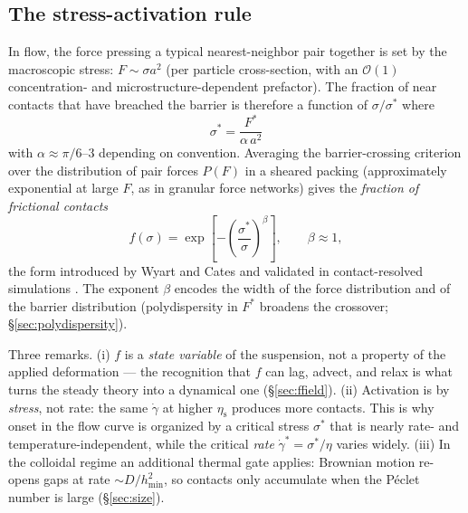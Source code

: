 \documentclass[11pt]{article}
\newcommand{\sigmastar}{\sigma^{*}}
\newcommand{\etas}{\eta_{\mathrm{s}}}
\newcommand{\Fstar}{F^{*}}
\newcommand{\gdot}{\dot{\gamma}}
\begin{document}
\subsection{The stress-activation rule}
\label{sec:activation}
In flow, the force pressing a typical nearest-neighbor pair together is set by the macroscopic stress: $F \sim \sigma a^2$ (per particle cross-section, with an $\mathcal{O}(1)$ concentration- and microstructure-dependent prefactor). The fraction of near contacts that have breached the barrier is therefore a function of $\sigma/\sigmastar$ where
\begin{equation}
\boxed{\;\sigmastar = \frac{\Fstar}{\alpha\, a^{2}}\;}
\label{eq:onsetstress}
\end{equation}
with $\alpha \approx \pi/6$--$3$ depending on convention. Averaging the barrier-crossing criterion over the distribution of pair forces $P(F)$ in a sheared packing (approximately exponential at large $F$, as in granular force networks) gives the \emph{fraction of frictional contacts}
\begin{equation}
f(\sigma) = \exp\!\left[-\left(\frac{\sigmastar}{\sigma}\right)^{\beta}\right], \qquad \beta \approx 1,
\label{eq:fsigma}
\end{equation}
the form introduced by Wyart and Cates \cite{wyart2014} and validated in contact-resolved simulations \cite{mari2014,ness2016}. The exponent $\beta$ encodes the width of the force distribution and of the barrier distribution (polydispersity in $\Fstar$ broadens the crossover; \S\ref{sec:polydispersity}).

Three remarks. (i) $f$ is a \emph{state variable} of the suspension, not a property of the applied deformation --- the recognition that $f$ can lag, advect, and relax is what turns the steady theory into a dynamical one (\S\ref{sec:ffield}). (ii) Activation is by \emph{stress}, not rate: the same $\gdot$ at higher $\etas$ produces more contacts. This is why onset in the flow curve is organized by a critical stress $\sigmastar$ that is nearly rate- and temperature-independent, while the critical \emph{rate} $\gdot^* = \sigmastar/\eta$ varies widely. (iii) In the colloidal regime an additional thermal gate applies: Brownian motion re-opens gaps at rate $\sim D/h_{\min}^2$, so contacts only accumulate when the P\'eclet number is large (\S\ref{sec:size}).
\end{document}
